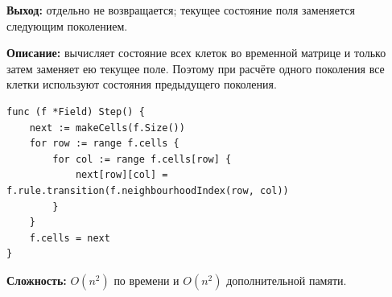 \textbf{Выход:} отдельно не возвращается; текущее состояние поля заменяется
следующим поколением.

\textbf{Описание:} вычисляет состояние всех клеток во временной матрице и
только затем заменяет ею текущее поле. Поэтому при расчёте одного поколения
все клетки используют состояния предыдущего поколения.

\begin{lstlisting}[style=gostyle,caption={Вычисление следующего поколения}]
func (f *Field) Step() {
    next := makeCells(f.Size())
    for row := range f.cells {
        for col := range f.cells[row] {
            next[row][col] = f.rule.transition(f.neighbourhoodIndex(row, col))
        }
    }
    f.cells = next
}
\end{lstlisting}

\textbf{Сложность:} $O(n^2)$ по времени и $O(n^2)$ дополнительной памяти.
